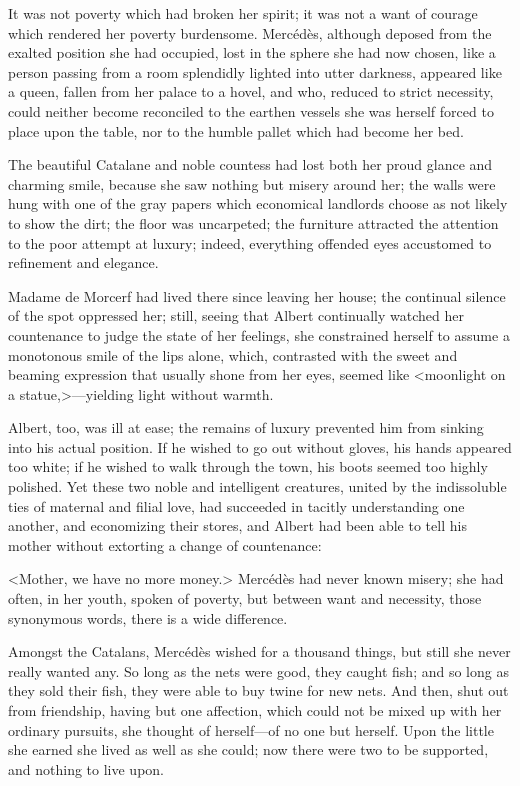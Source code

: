  It was not poverty which had broken her spirit; it was not a want of courage which rendered her poverty burdensome. Mercédès, although deposed from the exalted position she had occupied, lost in the sphere she had now chosen, like a person passing from a room splendidly lighted into utter darkness, appeared like a queen, fallen from her palace to a hovel, and who, reduced to strict necessity, could neither become reconciled to the earthen vessels she was herself forced to place upon the table, nor to the humble pallet which had become her bed. 

 The beautiful Catalane and noble countess had lost both her proud glance and charming smile, because she saw nothing but misery around her; the walls were hung with one of the gray papers which economical landlords choose as not likely to show the dirt; the floor was uncarpeted; the furniture attracted the attention to the poor attempt at luxury; indeed, everything offended eyes accustomed to refinement and elegance. 

 Madame de Morcerf had lived there since leaving her house; the continual silence of the spot oppressed her; still, seeing that Albert continually watched her countenance to judge the state of her feelings, she constrained herself to assume a monotonous smile of the lips alone, which, contrasted with the sweet and beaming expression that usually shone from her eyes, seemed like <moonlight on a statue,>—yielding light without warmth. 

 Albert, too, was ill at ease; the remains of luxury prevented him from sinking into his actual position. If he wished to go out without gloves, his hands appeared too white; if he wished to walk through the town, his boots seemed too highly polished. Yet these two noble and intelligent creatures, united by the indissoluble ties of maternal and filial love, had succeeded in tacitly understanding one another, and economizing their stores, and Albert had been able to tell his mother without extorting a change of countenance: 

 <Mother, we have no more money.>  Mercédès had never known misery; she had often, in her youth, spoken of poverty, but between want and necessity, those synonymous words, there is a wide difference. 

 Amongst the Catalans, Mercédès wished for a thousand things, but still she never really wanted any. So long as the nets were good, they caught fish; and so long as they sold their fish, they were able to buy twine for new nets. And then, shut out from friendship, having but one affection, which could not be mixed up with her ordinary pursuits, she thought of herself—of no one but herself. Upon the little she earned she lived as well as she could; now there were two to be supported, and nothing to live upon. 


